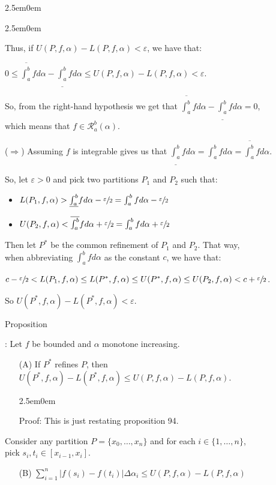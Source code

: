 \documentclass{book}
\newcommand{\hThree}{%
   \color{PineGreen!85!Orange}
   \fontsize{13}{15}\selectfont%
}
\newenvironment{myIndent}{%
   \begin{adjustwidth}{2.5em}{0em}%
}{%
   \end{adjustwidth}%
}
\newcounter{PropNumber}
\newcommand{\propCount}[1][1]{%
   \addtocounter{PropNumber}{#1}%
   \thePropNumber%
}
\newcommand{\retTwo}{\hfill\bigbreak}
\begin{document}
{\begin{myIndent}
{\begin{myIndent}
      Thus, if $U(P, f, \alpha) - L(P, f, \alpha) < \varepsilon$, we have that:
      
      {\center$0 \leq \overline{\int_a^b}fd\alpha - \underline{\int_a^b}fd\alpha \leq U(P, f, \alpha) - L(P, f, \alpha) < \varepsilon$.\retTwo\par}

      So, from the right-hand hypothesis we get that $\overline{\int_a^b}fd\alpha - \underline{\int_a^b}fd\alpha = 0$,\\ [-4pt] which means that $f \in \mathscr{R}_a^b(\alpha)$.\retTwo

      ($\Longrightarrow$) Assuming $f$ is integrable gives us that $\underline{\int_a^b}fd\alpha = \int_a^bfd\alpha = \overline{\int_a^b}fd\alpha$.\retTwo
      
      So, let $\varepsilon > 0$ and pick two partitions $P_1$ and $P_2$ such that:
      \begin{itemize}
         \item $L(P_1, f, \alpha) > \underline{\int_a^b}fd\alpha - \sfrac{\varepsilon}{2} = \int_a^bfd\alpha - \sfrac{\varepsilon}{2}$
         \item $U(P_2, f, \alpha) < \overline{\int_a^b}fd\alpha + \sfrac{\varepsilon}{2} = \int_a^bfd\alpha + \sfrac{\varepsilon}{2}$\\
      \end{itemize}

      Then let $P^*$ be the common refinement of $P_1$ and $P_2$. That way,\\ when abbreviating $\int_a^bfd\alpha$ as the constant $c$, we have that:\\ [-8pt]

      {\centering\fontsize{12}{14}\selectfont $c - \sfrac{\varepsilon}{2} < L(P_1, f, \alpha) \leq L(P^*, f, \alpha) \leq U(P^*, f, \alpha) \leq U(P_2, f, \alpha) < c + \sfrac{\varepsilon}{2}$.\retTwo\par}

      So $U(P^*, f, \alpha) - L(P^*, f, \alpha) < \varepsilon$.\retTwo\retTwo
   \end{myIndent}}

   Proposition \propCount: Let $f$ be bounded and $\alpha$ monotone increasing.
   \begin{itemize}
      \item[(A)] If $P^*$ refines $P$, then $U(P^*, f, \alpha) - L(P^*, f, \alpha) \leq U(P, f, \alpha) - L(P, f, \alpha)$.
      
      {\begin{myIndent}\hThree
         Proof: This is just restating proposition 94.\retTwo
      \end{myIndent}}
   \end{itemize}
   Consider any partition $P = \{x_0, \ldots, x_n\}$ and for each $i \in \{1, \ldots, n\}$,\\ pick $s_i, t_i \in [x_{i-1}, x_i]$.
   \begin{itemize}
      \item[(B)] $\sum\limits_{i=1}^n\left|f(s_i) - f(t_i)\right|\Delta \alpha_i \leq U(P, f, \alpha) - L(P, f, \alpha)$
      

\end{itemize}
\end{myIndent}}
\end{document}
